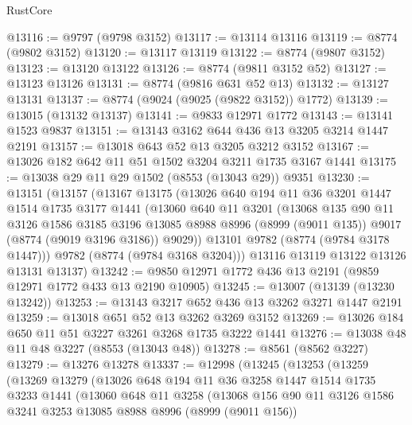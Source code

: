 \begin{lexlean}{RustCore}
\begin{coremodule}
@13116 := @9797 (@9798 @3152)
@13117 := @13114 @13116
@13119 := @8774 (@9802 @3152)
@13120 := @13117 @13119
@13122 := @8774 (@9807 @3152)
@13123 := @13120 @13122
@13126 := @8774 (@9811 @3152 @52)
@13127 := @13123 @13126
@13131 := @8774 (@9816 @631 @52 @13)
@13132 := @13127 @13131
@13137 := @8774 (@9024 (@9025 (@9822 @3152)) @1772)
@13139 := @13015 (@13132 @13137)
@13141 := @9833 @12971 @1772
@13143 := @13141 @1523 @9837
@13151 := @13143 @3162 @644 @436 @13 @3205 @3214 @1447 @2191
@13157 := @13018 @643 @52 @13 @3205 @3212 @3152
@13167 := @13026 @182 @642 @11 @51 @1502 @3204 @3211 @1735 @3167 @1441
@13175 := @13038 @29 @11 @29 @1502 (@8553 (@13043 @29)) @9351
@13230 := @13151
    (@13157
      (@13167
        @13175
        (@13026
          @640
          @194
          @11
          @36
          @3201
          @1447
          @1514
          @1735
          @3177
          @1441
          (@13060
            @640
            @11
            @3201
            (@13068
              @135
              @90
              @11
              @3126
              @1586
              @3185
              @3196
              @13085
              @8988
              @8996
              (@8999 (@9011 @135))
              @9017
              (@8774 (@9019 @3196 @3186))
              @9029))
          @13101
          @9782
          (@8774 (@9784 @3178 @1447)))
        @9782
        (@8774 (@9784 @3168 @3204)))
      @13116
      @13119
      @13122
      @13126
      @13131
      @13137)
@13242 := @9850 @12971 @1772 @436 @13 @2191 (@9859 @12971 @1772 @433 @13 @2190 @10905)
@13245 := @13007 (@13139 (@13230 @13242))
@13253 := @13143 @3217 @652 @436 @13 @3262 @3271 @1447 @2191
@13259 := @13018 @651 @52 @13 @3262 @3269 @3152
@13269 := @13026 @184 @650 @11 @51 @3227 @3261 @3268 @1735 @3222 @1441
@13276 := @13038 @48 @11 @48 @3227 (@8553 (@13043 @48))
@13278 := @8561 (@8562 @3227)
@13279 := @13276 @13278
@13337 := @12998
    (@13245
      (@13253
        (@13259
          (@13269
            @13279
            (@13026
              @648
              @194
              @11
              @36
              @3258
              @1447
              @1514
              @1735
              @3233
              @1441
              (@13060
                @648
                @11
                @3258
                (@13068
                  @156
                  @90
                  @11
                  @3126
                  @1586
                  @3241
                  @3253
                  @13085
                  @8988
                  @8996
                  (@8999 (@9011 @156))

\end{coremodule}
\end{lexlean}
